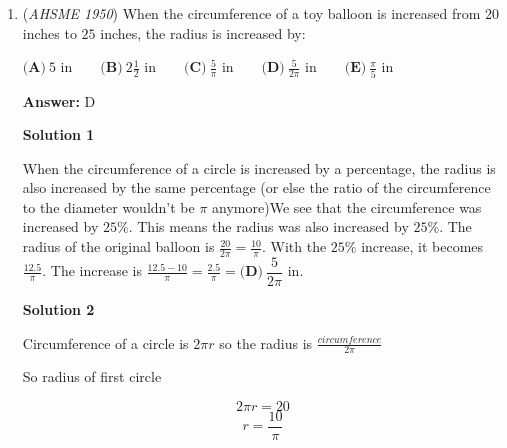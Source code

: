 \begin{enumerate}
 Cross sectional area of pipe with diameter $1 in$

 \[\pi r^2 = \pi \cdot 0.5 \cdot 0.5 = \frac{\pi}{4}\] 

 So number of 1 in pipes required is the number obtained by dividing their cross sectional areas

 
 \[\frac{9\pi}{\frac{\pi}{4}} = 36\]

 So the answer is $\boxed{\textbf{(D)}\ 36}$.

 



\textbf{Solution 2 (Solution 1 but easier)}

Knowing that $d^2 \alpha A$, where $d$ is the pipe diameter and $A$ is the cross-sectional area we simply get $6^2 = 36 = \boxed{\textbf{(D)}\ 36}$. 

 This works because the diameter of one of the other pipes is $1$, which is not affected by powers.

 


	\item (\textit{AHSME 1950}) When the circumference of a toy balloon is increased from $20$ inches to $25$ inches, the radius is increased by:


 $\textbf{(A)}\ 5\text{ in}\qquad\textbf{(B)}\ 2\frac{1}{2}\text{ in}\qquad\textbf{(C)}\ \frac{5}{\pi}\text{ in}\qquad\textbf{(D)}\ \frac{5}{2\pi}\text{ in}\qquad\textbf{(E)}\ \frac{\pi}{5}\text{ in}$

 \textbf{Answer: }D



\textbf{Solution 1}

When the circumference of a circle is increased by a percentage, the radius is also increased by the same percentage (or else the ratio of the circumference to the diameter wouldn't be $\pi$ anymore)We see that the circumference was increased by $25\%$. This means the radius was also increased by $25\%$. The radius of the original balloon is $\frac{20}{2\pi}=\frac{10}{\pi}$. With the $25\%$ increase, it becomes $\frac{12.5}{\pi}$. The increase is $\frac{12.5-10}{\pi}=\frac{2.5}{\pi}=\boxed{\textbf{(D)}\ \dfrac{5}{2\pi}\text{ in}}$.

 



\textbf{Solution 2}

Circumference of a circle is $2 \pi r$ so the radius is $\frac{circumference}{2 \pi}$

 So radius of first circle

 
 \[2 \pi r = 20\]
 \[r = \frac{10}{\pi}\]


\end{enumerate}

